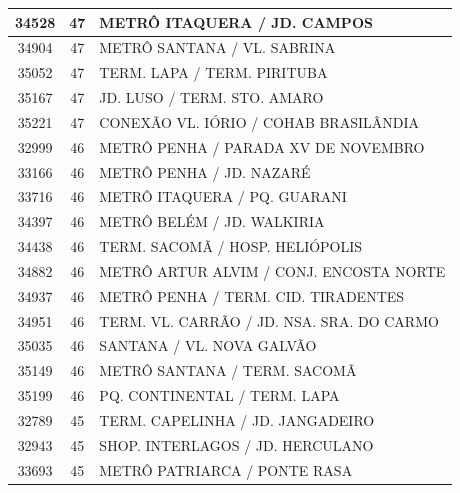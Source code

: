 \documentclass[
	12pt,				%
	oneside,			%
	a4paper,			%
	english,			%
	brazil				%
	]{abntex2ppgsi}
\begin{document}
{{\begin{apendicesenv}
\begin{longtable}{c|c|p{7cm}}
    34528 & 47    & METRÔ ITAQUERA / JD. CAMPOS \\
\hline

    34904 & 47    & METRÔ SANTANA / VL. SABRINA \\
\hline

    35052 & 47    & TERM. LAPA / TERM. PIRITUBA \\
\hline

    35167 & 47    & JD. LUSO / TERM. STO. AMARO \\
\hline

    35221 & 47    & CONEXÃO VL. IÓRIO / COHAB BRASILÂNDIA \\
\hline

    32999 & 46    & METRÔ PENHA / PARADA XV DE NOVEMBRO \\
\hline

    33166 & 46    & METRÔ PENHA / JD. NAZARÉ \\
\hline

    33716 & 46    & METRÔ ITAQUERA / PQ. GUARANI \\
\hline

    34397 & 46    & METRÔ BELÉM / JD. WALKIRIA \\
\hline

    34438 & 46    & TERM. SACOMÃ / HOSP. HELIÓPOLIS \\
\hline

    34882 & 46    & METRÔ ARTUR ALVIM / CONJ. ENCOSTA NORTE \\
\hline

    34937 & 46    & METRÔ PENHA / TERM. CID. TIRADENTES \\
\hline

    34951 & 46    & TERM. VL. CARRÃO / JD. NSA. SRA. DO CARMO \\
\hline

    35035 & 46    & SANTANA / VL. NOVA GALVÃO \\
\hline

    35149 & 46    & METRÔ SANTANA / TERM. SACOMÃ \\
\hline

    35199 & 46    & PQ. CONTINENTAL / TERM. LAPA \\
\hline

    32789 & 45    & TERM. CAPELINHA / JD. JANGADEIRO \\
\hline

    32943 & 45    & SHOP. INTERLAGOS / JD. HERCULANO \\
\hline

    33693 & 45    & METRÔ PATRIARCA / PONTE RASA \\
\hline


\end{longtable}
\end{apendicesenv}}}
\end{document}
